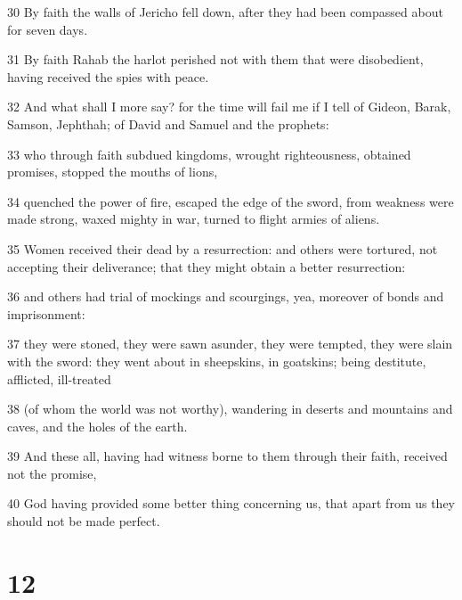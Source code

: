 \par 30 By faith the walls of Jericho fell down, after they had been compassed about for seven days.
\par 31 By faith Rahab the harlot perished not with them that were disobedient, having received the spies with peace.
\par 32 And what shall I more say? for the time will fail me if I tell of Gideon, Barak, Samson, Jephthah; of David and Samuel and the prophets:
\par 33 who through faith subdued kingdoms, wrought righteousness, obtained promises, stopped the mouths of lions,
\par 34 quenched the power of fire, escaped the edge of the sword, from weakness were made strong, waxed mighty in war, turned to flight armies of aliens.
\par 35 Women received their dead by a resurrection: and others were tortured, not accepting their deliverance; that they might obtain a better resurrection:
\par 36 and others had trial of mockings and scourgings, yea, moreover of bonds and imprisonment:
\par 37 they were stoned, they were sawn asunder, they were tempted, they were slain with the sword: they went about in sheepskins, in goatskins; being destitute, afflicted, ill-treated
\par 38 (of whom the world was not worthy), wandering in deserts and mountains and caves, and the holes of the earth.
\par 39 And these all, having had witness borne to them through their faith, received not the promise,
\par 40 God having provided some better thing concerning us, that apart from us they should not be made perfect.

\chapter{12}

